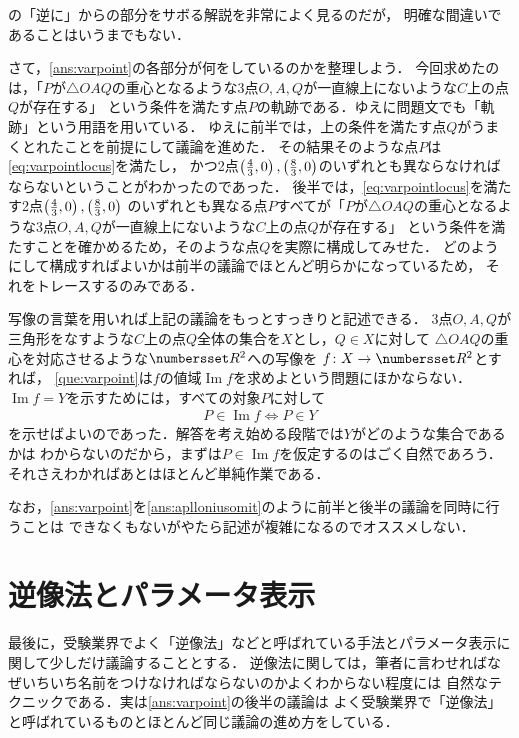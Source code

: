 \documentclass[11pt,a4paper]{ltjsarticle}
\newcommand*{\equivalent}{\Longleftrightarrow}
\newcommand*{\coord}[1]{\paren{#1}}
\DeclareMathOperator{\Image}{Im}
\theoremstyle{definition}
\begin{document}
の「逆に」からの部分をサボる解説を非常によく見るのだが，
明確な間違いであることはいうまでもない．

さて，\cref{ans:varpoint}の各部分が何をしているのかを整理しよう．
今回求めたのは，「$P$が$\triangle OAQ$の重心となるような3点$O,A,Q$が一直線上にないような$C$上の点$Q$が存在する」
という条件を満たす点$P$の軌跡である．ゆえに問題文でも「軌跡」という用語を用いている．
ゆえに前半では，上の条件を満たす点$Q$がうまくとれたことを前提にして議論を進めた．
その結果そのような点$P$は\cref{eq:varpointlocus}を満たし，
かつ2点$\coord{\frac{4}{3}, 0}, \coord{\frac{8}{3}, 0}$のいずれとも異ならなければならないということがわかったのであった．
後半では，\cref{eq:varpointlocus}を満たす2点$\coord{\frac{4}{3}, 0}, \coord{\frac{8}{3}, 0}$
のいずれとも異なる点$P$すべてが「$P$が$\triangle OAQ$の重心となるような3点$O,A,Q$が一直線上にないような$C$上の点$Q$が存在する」
という条件を満たすことを確かめるため，そのような点$Q$を実際に構成してみせた．
どのようにして構成すればよいかは前半の議論でほとんど明らかになっているため，
それをトレースするのみである．

写像の言葉を用いれば上記の議論をもっとすっきりと記述できる．
3点$O,A,Q$が三角形をなすような$C$上の点$Q$全体の集合を$X$とし，$Q \in X$に対して
$\triangle OAQ$の重心を対応させるような$\Real^2$への写像を
$f \colon X \to \Real^2$とすれば，
\cref{que:varpoint}は$f$の値域$\Image f$を求めよという問題にほかならない．
$\Image f = Y$を示すためには，すべての対象$P$に対して
\begin{align}
  P \in \Image f \equivalent P \in Y
  \label{eq:imageiquiv}
\end{align}
を示せばよいのであった．解答を考え始める段階では$Y$がどのような集合であるかは
わからないのだから，まずは$P \in \Image f$を仮定するのはごく自然であろう．
それさえわかればあとはほとんど単純作業である．

なお，\cref{ans:varpoint}を\cref{ans:aplloniusomit}のように前半と後半の議論を同時に行うことは
できなくもないがやたら記述が複雑になるのでオススメしない．



\section{逆像法とパラメータ表示}

最後に，受験業界でよく「逆像法」などと呼ばれている手法とパラメータ表示に関して少しだけ議論することとする．
逆像法に関しては，筆者に言わせればなぜいちいち名前をつけなければならないのかよくわからない程度には
自然なテクニックである．実は\cref{ans:varpoint}の後半の議論は
よく受験業界で「逆像法」と呼ばれているものとほとんど同じ議論の進め方をしている．
\end{document}
